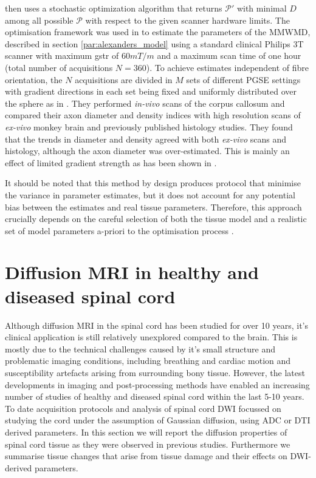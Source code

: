 \citet{Alexander:2008} then uses a stochastic optimization algorithm \citep{Zelinka:2010} that returns $\mathcal{P}'$ with minimal $D$ among all possible $\mathcal{P}$ with respect to the given scanner hardware limits. The optimisation framework was used in \citet{Alexander:2010} to estimate the parameters of the \gls{MMWMD}, described in section \ref{par:alexanders_model} using a standard clinical Philips 3T scanner with maximum {\gls{gstr}} of $60mT/m$ and a maximum scan time of one hour (total number of acquisitions $N=360$). To achieve estimates independent of fibre orientation, the $N$ acquisitions are divided in $M$ sets of different PGSE settings with gradient directions in each set being fixed and uniformly distributed over the sphere as in \cite{Cook:2007}. They performed \emph{in-vivo} scans of the corpus callosum and compared their axon diameter and density indices with high resolution scans of \emph{ex-vivo} monkey brain and previously published histology studies. They found that the trends in diameter and density agreed with both \emph{ex-vivo} scans and histology, although the axon diameter was over-estimated. This is mainly an effect of limited gradient strength as has been shown in \cite{Dyrby:2010}. 


It should be noted that this method by design produces protocol that minimise the variance in parameter estimates, but it does not account for any potential bias between the estimates and real tissue parameters. Therefore, this approach crucially depends on the careful selection of both the tissue model and a realistic set of model parameters a-priori to the optimisation process \citep{Alexander:2008, Alexander:2010}. 




\section{Diffusion MRI in healthy and diseased spinal cord}
Although diffusion \gls{MRI} in the spinal cord has been studied for over 10 years, it's clinical application is still relatively unexplored compared to the brain. This is mostly due to the technical challenges caused by it's small structure and problematic imaging conditions, including breathing and cardiac motion and susceptibility artefacts arising from  surrounding bony tissue. However, the latest developments in imaging and post-processing methods have enabled an increasing number of studies of healthy and diseased spinal cord within the last 5-10 years. To date acquisition protocols and analysis of spinal cord \gls{DWI} focussed on studying the cord under the assumption of Gaussian diffusion, using \gls{ADC} or \gls{DTI} derived parameters. In this section we will report the diffusion properties of  spinal cord tissue as they were observed in previous studies. Furthermore we summarise tissue changes that arise from tissue damage  and their effects on \gls{DWI}-derived parameters.
